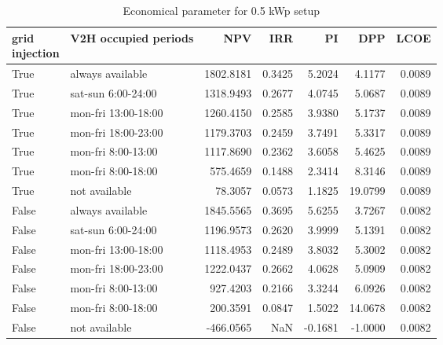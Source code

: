 \begin{table}
\centering
\caption{Economical parameter for 0.5 kWp setup}
\label{tab:results-0.5}
{\small
\begin{tabular}{llrrrrr}
\toprule
 \makecell{grid\\injection} & V2H occupied periods &       NPV &    IRR &      PI &     DPP &   LCOE \\
\midrule
           True &     always available & 1802.8181 & 0.3425 &  5.2024 &  4.1177 & 0.0089 \\
           True &   sat-sun 6:00-24:00 & 1318.9493 & 0.2677 &  4.0745 &  5.0687 & 0.0089 \\
           True &  mon-fri 13:00-18:00 & 1260.4150 & 0.2585 &  3.9380 &  5.1737 & 0.0089 \\
           True &  mon-fri 18:00-23:00 & 1179.3703 & 0.2459 &  3.7491 &  5.3317 & 0.0089 \\
           True &   mon-fri 8:00-13:00 & 1117.8690 & 0.2362 &  3.6058 &  5.4625 & 0.0089 \\
           True &   mon-fri 8:00-18:00 &  575.4659 & 0.1488 &  2.3414 &  8.3146 & 0.0089 \\
           True &        not available &   78.3057 & 0.0573 &  1.1825 & 19.0799 & 0.0089 \\
          False &     always available & 1845.5565 & 0.3695 &  5.6255 &  3.7267 & 0.0082 \\
          False &   sat-sun 6:00-24:00 & 1196.9573 & 0.2620 &  3.9999 &  5.1391 & 0.0082 \\
          False &  mon-fri 13:00-18:00 & 1118.4953 & 0.2489 &  3.8032 &  5.3002 & 0.0082 \\
          False &  mon-fri 18:00-23:00 & 1222.0437 & 0.2662 &  4.0628 &  5.0909 & 0.0082 \\
          False &   mon-fri 8:00-13:00 &  927.4203 & 0.2166 &  3.3244 &  6.0926 & 0.0082 \\
          False &   mon-fri 8:00-18:00 &  200.3591 & 0.0847 &  1.5022 & 14.0678 & 0.0082 \\
          False &        not available & -466.0565 &    NaN & -0.1681 & -1.0000 & 0.0082 \\
\bottomrule
\end{tabular}
}
\end{table}
